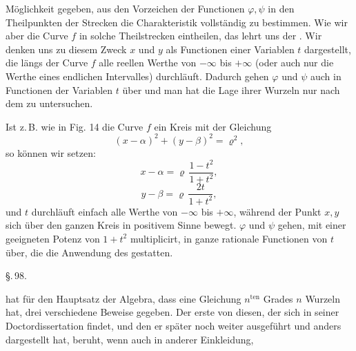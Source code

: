 Möglichkeit gegeben, aus den Vorzeichen der Functionen $\varphi, \psi$
in den Theilpunkten der Strecken die Charakteristik vollständig
zu bestimmen. Wie wir aber die Curve $f$ in solche Theilstrecken
eintheilen, das lehrt uns der . Wir denken
uns zu diesem Zweck $x$ und $y$ als Functionen einer Variablen $t$ dargestellt, die längs der Curve $f$ alle
reellen Werthe von $-\infty$ bis $+\infty$
(oder auch nur die Werthe eines
endlichen Intervalles) durchläuft. Dadurch gehen $\varphi$ und $\psi$ auch in Functionen der Variablen $t$ über und man
hat die Lage ihrer Wurzeln nur nach dem  zu untersuchen.


Ist z.\,B. wie in Fig. 14 die Curve $f$ ein Kreis mit der
Gleichung
\[
(x - \alpha)^2 + (y - \beta)^2 = \varrho^2,
\]
so können wir setzen:
\[
x - \alpha = \varrho\, \frac{1 - t^2}{1 + t^2},
\]
\[
y - \beta = \varrho\, \frac{2t}{1 + t^2},
\]
und $t$ durchläuft einfach alle Werthe von $-\infty$ bis $+\infty$, während
der Punkt $x, y$ sich über den ganzen Kreis in positivem Sinne
bewegt. $\varphi$ und $\psi$ gehen, mit einer geeigneten Potenz von
$1 + t^2$ multiplicirt, in ganze rationale Functionen von $t$ über,
die die Anwendung des  gestatten.

\begin{center}
\S.\,98.

\end{center}

 hat für den Hauptsatz der Algebra, dass eine Gleichung
$n^{\text{ten}}$ Grades $n$ Wurzeln hat, drei verschiedene Beweise
gegeben. Der erste von diesen, der sich in seiner Doctordissertation findet, und den er später noch weiter ausgeführt und
anders dargestellt hat, beruht, wenn auch in anderer Einkleidung,
